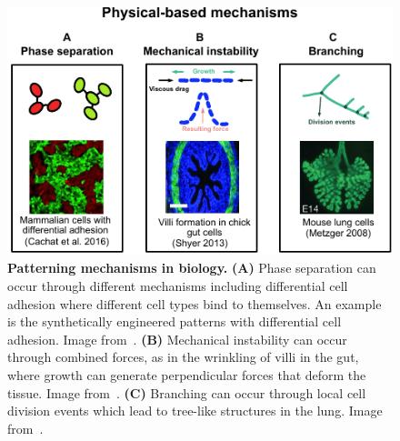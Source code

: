 \begin{figure}[H]
    \centering
    \includegraphics[width=1\textwidth]{chapters/Introduction/physical_based_mechanisms}
    \caption{\textbf{Patterning mechanisms in biology.} \textbf{(A)}
    Phase separation can occur through different mechanisms including differential cell adhesion where different cell types bind to themselves. An example is the synthetically engineered patterns with differential cell adhesion. Image from~\cite{cachat20162}.  \textbf{(B)} Mechanical instability can occur through combined forces, as in the wrinkling of villi in the gut, where growth can generate perpendicular forces that deform the tissue. Image from~\cite{shyer2013villification}.
    \textbf{(C)} Branching can occur through local cell division events which lead to tree-like structures in the lung. Image from~\cite{metzger2008branching}.}
    \label{fig:physical_based_mechanisms}
\end{figure}


